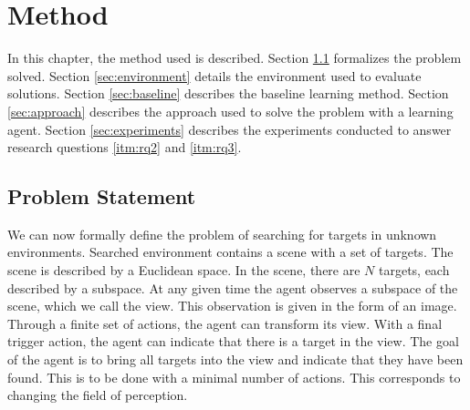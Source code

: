 \chapter{Method}
\label{cha:method}


% 

In this chapter, the method used is described.
Section \ref{sec:problem} formalizes the problem solved.
Section \ref{sec:environment} details the environment used to evaluate solutions.
Section \ref{sec:baseline} describes the baseline learning method.
Section \ref{sec:approach} describes the approach used to solve the problem with a learning agent.
Section \ref{sec:experiments} describes the experiments conducted to answer research questions \ref{itm:rq2} and \ref{itm:rq3}.

\section{Problem Statement}
\label{sec:problem}

We can now formally define the problem of searching for targets in unknown environments.
Searched environment contains a scene with a set of targets.
The scene is described by a Euclidean space.
In the scene, there are \(N\) targets, each described by a subspace.
At any given time the agent observes a subspace of the scene, which we call the view.
This observation is given in the form of an image.
Through a finite set of actions, the agent can transform its view.
With a final trigger action, the agent can indicate that there is a target in the view.
The goal of the agent is to bring all targets into the view and indicate that they have been found.
This is to be done with a minimal number of actions.
This corresponds to changing the field of perception.

